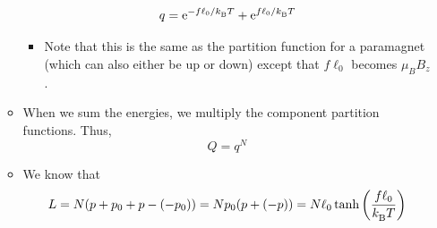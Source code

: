 \documentclass[../notes.tex]{subfiles}
\begin{document}
\begin{itemize}
\begin{itemize}
\begin{equation*}
            q = \e[-f\ell_0/\kB T]+\e[f\ell_0/\kB T]
        \end{equation*}
        \begin{itemize}
            \item Note that this is the same as the partition function for a paramagnet (which can also either be up or down) except that $f\ell_0$ becomes $\mu_BB_z$.
        \end{itemize}
        \item When we sum the energies, we multiply the component partition functions. Thus,
        \begin{equation*}
            Q = q^N
        \end{equation*}
        \item We know that
        \begin{equation*}
            L = N(p+p_0+p-(-p_0))
            = Np_0(p+(-p))
            = N\ell_0\tanh\left( \frac{f\ell_0}{\kB T} \right)
        \end{equation*}
    \end{itemize}
\end{itemize}
\end{document}
